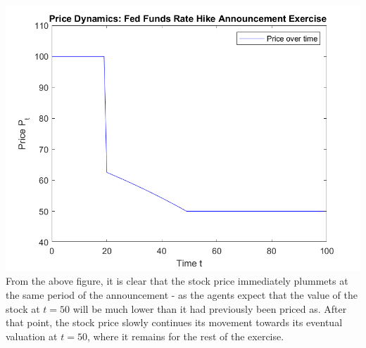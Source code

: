 \documentclass[11pt]{article} %
\begin{document}
\includegraphics{dynamics_announcement} \\
From the above figure, it is clear that the stock price immediately plummets at the same period of the announcement - as the agents expect that the value of the stock at $t=50$ will be much lower than it had previously been priced as. After that point, the stock price slowly continues its movement towards its eventual valuation at $t=50$, where it remains for the rest of the exercise.
\end{document}

